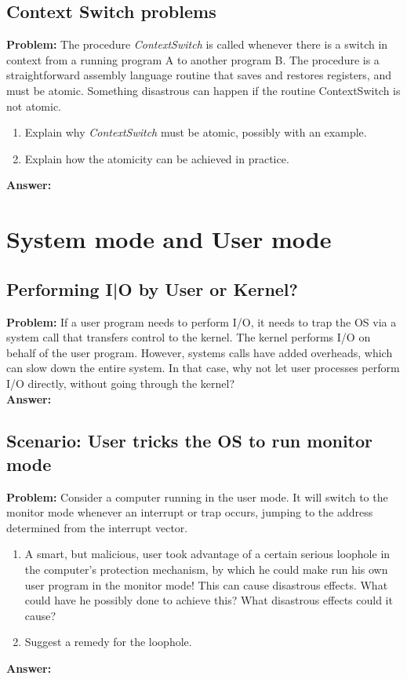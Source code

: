 \documentclass[a4paper]{article}
\begin{document}
\subsection{Context Switch problems}
\textbf{Problem:}
The procedure \textit{ContextSwitch} is called whenever there is a switch in context from a running program A to another program B.
 The procedure is a straightforward assembly language routine that saves and restores registers, and must be atomic.
 Something disastrous can happen if the routine ContextSwitch is not atomic.

 \begin{enumerate}
     \item Explain why \textit{ContextSwitch} must be atomic, possibly with an example.
    \item Explain how the atomicity can be achieved in practice.
 \end{enumerate}
 \textbf{Answer:}

 \newpage
\section{System mode and User mode}
\subsection{Performing I|O by User or Kernel?}
\textbf{Problem:}
If a user program needs to perform I/O, it needs to trap the OS via a system call that transfers control to the kernel. The kernel performs I/O on behalf of the user program.
However, systems calls have added overheads, which can slow down the entire system. In that case, why not let user processes perform I/O directly, without going through the kernel?
\\
\textbf{Answer:}


\subsection{Scenario: User tricks the OS to run monitor mode}
\textbf{Problem:}
Consider a computer running in the user mode.
It will switch to the monitor mode whenever an interrupt or trap occurs, jumping to the address determined from the interrupt vector.
\begin{enumerate}
    \item A smart, but malicious, user took advantage of a certain serious loophole in the computer's protection mechanism, by which he could make run his own user program in the monitor mode! This can cause disastrous effects.
    What could have he possibly done to achieve this? What disastrous effects could it cause?
    \item Suggest a remedy for the loophole.
\end{enumerate}
\textbf{Answer:}
\end{document}
